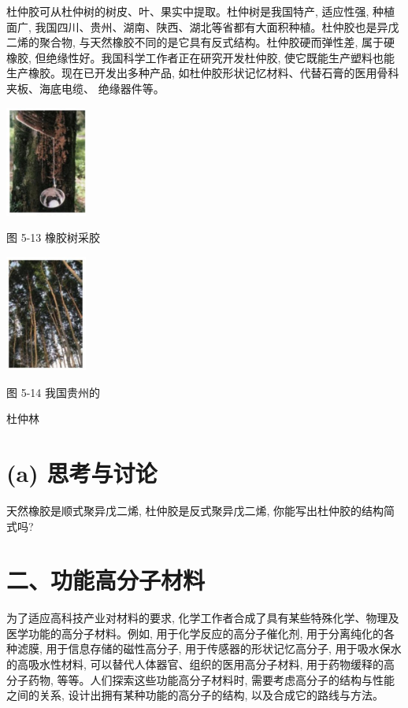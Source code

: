 \documentclass[10pt]{article}
\begin{document}
杜仲胶可从杜仲树的树皮、叶、果实中提取。杜仲树是我国特产, 适应性强, 种植面广, 我国四川、贵州、湖南、陕西、湖北等省都有大面积种植。杜仲胶也是异戊二烯的聚合物, 与天然橡胶不同的是它具有反式结构。杜仲胶硬而弹性差, 属于硬橡胶, 但绝缘性好。我国科学工作者正在研究开发杜仲胶, 使它既能生产塑料也能生产橡胶。现在已开发出多种产品, 如杜仲胶形状记忆材料、代替石膏的医用骨科夹板、海底电缆、 绝缘器件等。

\begin{center}
\includegraphics[max width=0.2\textwidth]{images/0190efc5-b58a-7c43-bfb0-e0a030df9cfd_150_621150.jpg}
\end{center}

图 5-13 橡胶树采胶

\begin{center}
\includegraphics[max width=0.2\textwidth]{images/0190efc5-b58a-7c43-bfb0-e0a030df9cfd_150_470086.jpg}
\end{center}

图 5-14 我国贵州的

杜仲林

\section*{(a) 思考与讨论}

天然橡胶是顺式聚异戊二烯, 杜仲胶是反式聚异戊二烯, 你能写出杜仲胶的结构简式吗?

\section*{二、功能高分子材料}

为了适应高科技产业对材料的要求, 化学工作者合成了具有某些特殊化学、物理及医学功能的高分子材料。例如, 用于化学反应的高分子催化剂, 用于分离纯化的各种滤膜, 用于信息存储的磁性高分子, 用于传感器的形状记忆高分子, 用于吸水保水的高吸水性材料, 可以替代人体器官、组织的医用高分子材料, 用于药物缓释的高分子药物, 等等。人们探索这些功能高分子材料时, 需要考虑高分子的结构与性能之间的关系, 设计出拥有某种功能的高分子的结构, 以及合成它的路线与方法。
\end{document}
